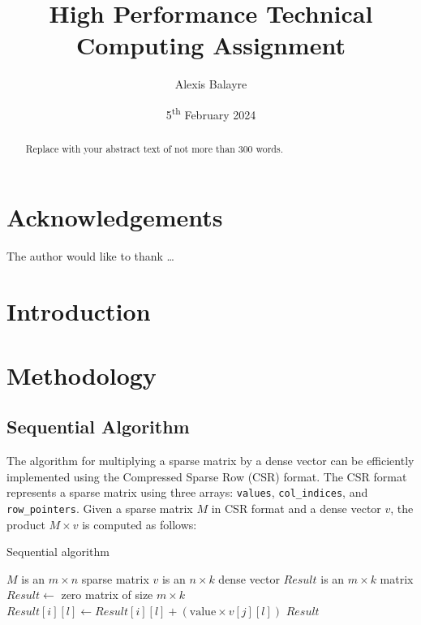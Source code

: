 \documentclass[12pt,oneside]{book} %
\title{High Performance Technical Computing Assignment}
\author{Alexis Balayre}
\date{5\textsuperscript{th} February 2024}
\begin{document}
\frontmatter

\maketitle

\begin{abstract}
    Replace with your abstract text of not more than 300 words.
\end{abstract}

\chapter{Acknowledgements}
The author would like to thank \dots

{
    \clearpage
    \singlespacing
    {
        \tableofcontents
    }
    \clearpage

    \listoffigures

    \listoftables
}

\mainmatter
\pagestyle{fancy}
\fancyhead[L]{\nouppercase{\leftmark}}
\fancyhead[R]{\nouppercase{\rightmark}}

\chapter{Introduction}

\chapter{Methodology}
\section{Sequential Algorithm}

The algorithm for multiplying a sparse matrix by a dense vector can be
efficiently implemented using the Compressed Sparse Row (CSR) format. The CSR
format represents a sparse matrix using three arrays: \texttt{values},
\texttt{col\_indices}, and \texttt{row\_pointers}. Given a sparse matrix \( M
\) in CSR format and a dense vector \( v \), the product \( M \times v \) is
computed as follows:

\begin{algorithm}[H]
    \caption{Sequential algorithm}
    \begin{algorithmic}
        \Require $M$ is an $m \times n$ sparse matrix
        \Require $v$ is an $n \times k$ dense vector
        \Ensure  $Result$ is an $m \times k$ matrix
        \State $Result \gets$ zero matrix of size $m \times k$
        \State $Result[i][l] \gets Result[i][l] + (\text{value} \times v[j][l])$
        \EndFor
        \EndFor
        \EndFor
        \State \Return $Result$
    \end{algorithmic}
\end{algorithm}
\end{document}
